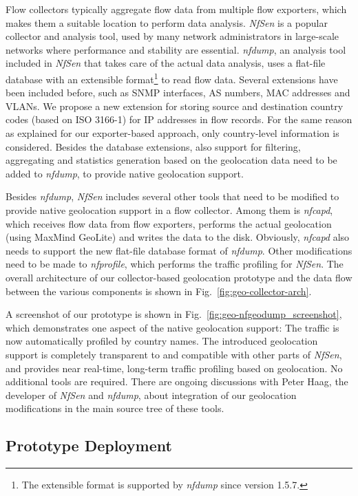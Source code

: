 Flow collectors typically aggregate flow data from multiple flow exporters, which makes them a suitable location to perform data analysis. \textit{NfSen} is a popular collector and analysis tool, used by many network administrators in large-scale networks where performance and stability are essential. \textit{nfdump}, an analysis tool included in \textit{NfSen} that takes care of the actual data analysis, uses a flat-file database with an extensible format\footnote{The extensible format is supported by \textit{nfdump} since version 1.5.7.} to read flow data. Several extensions have been included before, such as SNMP interfaces, AS numbers, MAC addresses and VLANs. We propose a new extension for storing source and destination country codes (based on ISO 3166-1) for IP addresses in flow records. For the same reason as explained for our exporter-based approach, only country-level information is considered. Besides the database extensions, also support for filtering, aggregating and statistics generation based on the geolocation data need to be added to \textit{nfdump}, to provide native geolocation support.

Besides \textit{nfdump}, \textit{NfSen} includes several other tools that need to be modified to provide native geolocation support in a flow collector. Among them is \textit{nfcapd}, which receives flow data from flow exporters, performs the actual geolocation (using MaxMind GeoLite) and writes the data to the disk. Obviously, \textit{nfcapd} also needs to support the new flat-file database format of \textit{nfdump}. Other modifications need to be made to \textit{nfprofile}, which performs the traffic profiling for \textit{NfSen}. The overall architecture of our collector-based geolocation prototype and the data flow between the various components is shown in Fig.~\ref{fig:geo-collector-arch}.

A screenshot of our prototype is shown in Fig.~\ref{fig:geo-nfgeodump_screenshot}, which demonstrates one aspect of the native geolocation support: The traffic is now automatically profiled by country names. The introduced geolocation support is completely transparent to and compatible with other parts of \textit{NfSen}, and provides near real-time, long-term traffic profiling based on geolocation. No additional tools are required. There are ongoing discussions with Peter Haag, the developer of \textit{NfSen} and \textit{nfdump}, about integration of our geolocation modifications in the main source tree of these tools.

\subsection{Prototype Deployment} \label{subsec:geo-prototype_deployment}

